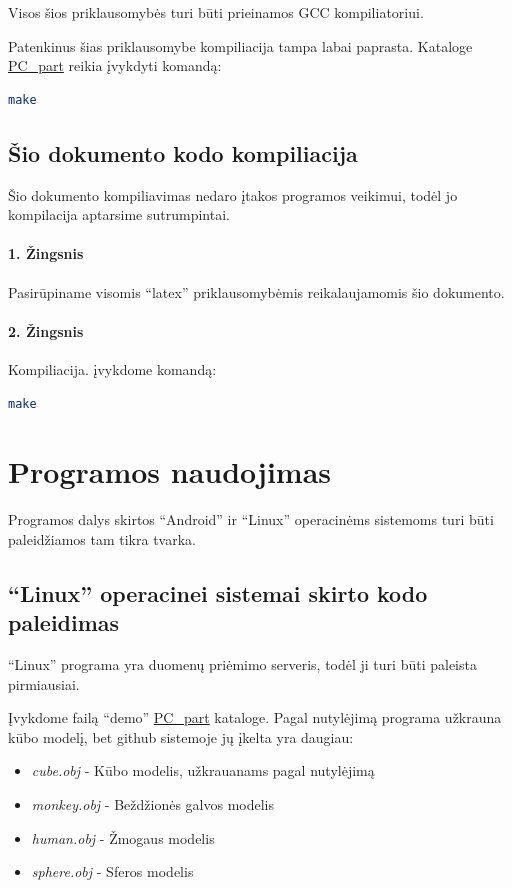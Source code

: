 \documentclass[12pt, a4paper, lithuanian, final]{article}
\begin{document}
Visos šios priklausomybės turi būti prieinamos GCC kompiliatoriui.


Patenkinus šias priklausomybe kompiliacija tampa labai paprasta.
Kataloge \url{PC_part} reikia įvykdyti komandą:
\begin{lstlisting}[language=bash]
 make
\end{lstlisting}



\subsection{Šio dokumento kodo kompiliacija}
Šio dokumento kompiliavimas nedaro įtakos programos veikimui, todėl jo kompilacija aptarsime sutrumpintai.

\paragraph{1. Žingsnis}
Pasirūpiname visomis "`latex"' priklausomybėmis reikalaujamomis šio dokumento.

\paragraph{2. Žingsnis}
Kompiliacija. įvykdome komandą:

\begin{lstlisting}[language=bash]
 make
\end{lstlisting}


\section{Programos naudojimas}
Programos dalys skirtos "`Android"' ir "`Linux"' operacinėms sistemoms turi būti paleidžiamos tam tikra tvarka.

\subsection{"`Linux"' operacinei sistemai skirto kodo paleidimas}
"`Linux"' programa yra duomenų priėmimo serveris, todėl ji turi būti paleista pirmiausiai.

Įvykdome failą "`demo"' \url{PC_part} kataloge.
Pagal nutylėjimą programa užkrauna kūbo modelį, bet github sistemoje jų įkelta yra daugiau:
\begin{itemize}
	\item \textit{cube.obj} - Kūbo modelis, užkrauanams pagal nutylėjimą
	\item \textit{monkey.obj} - Beždžionės galvos modelis
	\item \textit{human.obj} - Žmogaus modelis
	\item \textit{sphere.obj} - Sferos modelis
\end{itemize}
\end{document}
